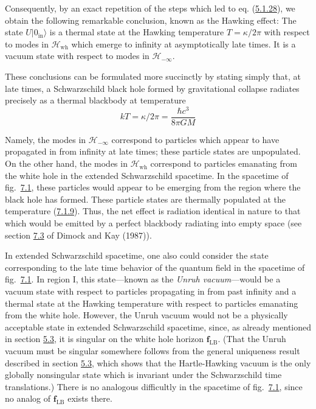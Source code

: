\documentclass[11pt,a4paper]{article}
\begin{document}
Consequently, by an exact repetition of the steps which led to eq. (\hyperref[eq:5.1.28]{5.1.28}), we obtain the following remarkable conclusion, known as the Hawking effect: The state \(U\lvert 0_{\mathrm{in}}\rangle\) is a thermal state at the Hawking temperature \(T=\kappa/2\pi\) with respect to modes in \(\mathcal{H}_{\mathrm{wh}}\) which emerge to infinity at asymptotically late times. It is a vacuum state with respect to modes in \(\mathcal{H}_{-\infty}\).

These conclusions can be formulated more succinctly by stating simply that, at late times, a Schwarzschild black hole formed by gravitational collapse radiates precisely as a thermal blackbody at temperature
\begin{equation*}
kT = \kappa/2\pi = \frac{\hbar c^3}{8\pi GM} \tag{7.1.9}\label{eq:7.1.9}
\end{equation*}

Namely, the modes in \(\mathcal{H}_{-\infty}\) correspond to particles which appear to have propagated in from infinity at late times; these particle states are unpopulated. On the other hand, the modes in \(\mathcal{H}_{\mathrm{wh}}\) correspond to particles emanating from the white hole in the extended Schwarzschild spacetime. In the spacetime of fig.~\hyperref[fig:7.1]{7.1}, these particles would appear to be emerging from the region where the black \hypertarget{source-171}{} hole has formed. These particle states are thermally populated at the temperature (\hyperref[eq:7.1.9]{7.1.9}). Thus, the net effect is radiation identical in nature to that which would be emitted by a perfect blackbody radiating into empty space (see section \hyperlink{sec:7.3}{7.3} of Dimock and Kay (1987)).

In extended Schwarzschild spacetime, one also could consider the state corresponding to the late time behavior of the quantum field in the spacetime of fig.~\hyperref[fig:7.1]{7.1}. In region I, this state---known as the \emph{Unruh vacuum}---would be a vacuum state with respect to particles propagating in from past infinity and a thermal state at the Hawking temperature with respect to particles emanating from the white hole. However, the Unruh vacuum would not be a physically acceptable state in extended Schwarzschild spacetime, since, as already mentioned in section \hyperlink{sec:5.3}{5.3}, it is singular on the white hole horizon \(\mathbf{f}_{\text{LB}}\). (That the Unruh vacuum must be singular somewhere follows from the general uniqueness result described in section \hyperlink{sec:5.3}{5.3}, which shows that the Hartle-Hawking vacuum is the only globally nonsingular state which is invariant under the Schwarzschild time translations.) There is no analogous difficultly in the spacetime of fig.~\hyperref[fig:7.1]{7.1}, since no analog of \(\mathbf{f}_{\text{LB}}\) exists there.
\end{document}
